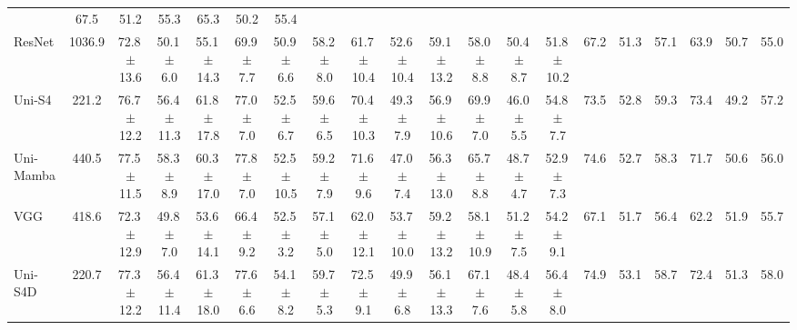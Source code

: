 \documentclass[sigconf,nonacm]{acmart}
\begin{document}
\begin{table}[t]
{\begin{tabular}{lccccccccccccccccccc}
      & 67.5 & 51.2 & 55.3 & 65.3 & 50.2 & 55.4 \\
    ResNet & 1036.9
      & 72.8{\scriptsize\,$\pm$13.6} & 50.1{\scriptsize\,$\pm$6.0}  & 55.1{\scriptsize\,$\pm$14.3}
      & 69.9{\scriptsize\,$\pm$7.7}  & 50.9{\scriptsize\,$\pm$6.6}  & 58.2{\scriptsize\,$\pm$8.0}
      & 61.7{\scriptsize\,$\pm$10.4} & 52.6{\scriptsize\,$\pm$10.4} & 59.1{\scriptsize\,$\pm$13.2}
      & 58.0{\scriptsize\,$\pm$8.8}  & 50.4{\scriptsize\,$\pm$8.7}  & 51.8{\scriptsize\,$\pm$10.2}
      & 67.2 & 51.3 & 57.1 & 63.9 & 50.7 & 55.0 \\
    Uni-S4 & 221.2
      & 76.7{\scriptsize\,$\pm$12.2} & 56.4{\scriptsize\,$\pm$11.3} & 61.8{\scriptsize\,$\pm$17.8}
      & 77.0{\scriptsize\,$\pm$7.0}  & 52.5{\scriptsize\,$\pm$6.7}  & 59.6{\scriptsize\,$\pm$6.5}
      & 70.4{\scriptsize\,$\pm$10.3} & 49.3{\scriptsize\,$\pm$7.9}  & 56.9{\scriptsize\,$\pm$10.6}
      & 69.9{\scriptsize\,$\pm$7.0}  & 46.0{\scriptsize\,$\pm$5.5}  & 54.8{\scriptsize\,$\pm$7.7}
      & 73.5 & 52.8 & 59.3 & 73.4 & 49.2 & 57.2 \\
    Uni-Mamba & 440.5
      & 77.5{\scriptsize\,$\pm$11.5} & 58.3{\scriptsize\,$\pm$8.9}  & 60.3{\scriptsize\,$\pm$17.0}
      & 77.8{\scriptsize\,$\pm$7.0}  & 52.5{\scriptsize\,$\pm$10.5} & 59.2{\scriptsize\,$\pm$7.9}
      & 71.6{\scriptsize\,$\pm$9.6}  & 47.0{\scriptsize\,$\pm$7.4}  & 56.3{\scriptsize\,$\pm$13.0}
      & 65.7{\scriptsize\,$\pm$8.8}  & 48.7{\scriptsize\,$\pm$4.7}  & 52.9{\scriptsize\,$\pm$7.3}
      & 74.6 & 52.7 & 58.3 & 71.7 & 50.6 & 56.0 \\
    VGG & 418.6
      & 72.3{\scriptsize\,$\pm$12.9} & 49.8{\scriptsize\,$\pm$7.0}  & 53.6{\scriptsize\,$\pm$14.1}
      & 66.4{\scriptsize\,$\pm$9.2}  & 52.5{\scriptsize\,$\pm$3.2}  & 57.1{\scriptsize\,$\pm$5.0}
      & 62.0{\scriptsize\,$\pm$12.1} & 53.7{\scriptsize\,$\pm$10.0} & 59.2{\scriptsize\,$\pm$13.2}
      & 58.1{\scriptsize\,$\pm$10.9} & 51.2{\scriptsize\,$\pm$7.5}  & 54.2{\scriptsize\,$\pm$9.1}
      & 67.1 & 51.7 & 56.4 & 62.2 & 51.9 & 55.7 \\
    Uni-S4D & 220.7
      & 77.3{\scriptsize\,$\pm$12.2} & 56.4{\scriptsize\,$\pm$11.4} & 61.3{\scriptsize\,$\pm$18.0}
      & 77.6{\scriptsize\,$\pm$6.6}  & 54.1{\scriptsize\,$\pm$8.2}  & 59.7{\scriptsize\,$\pm$5.3}
      & 72.5{\scriptsize\,$\pm$9.1}  & 49.9{\scriptsize\,$\pm$6.8}  & 56.1{\scriptsize\,$\pm$13.3}
      & 67.1{\scriptsize\,$\pm$7.6}  & 48.4{\scriptsize\,$\pm$5.8}  & 56.4{\scriptsize\,$\pm$8.0}
      & 74.9 & 53.1 & 58.7 & 72.4 & 51.3 & 58.0 \\

\end{tabular}}
\end{table}
\end{document}
